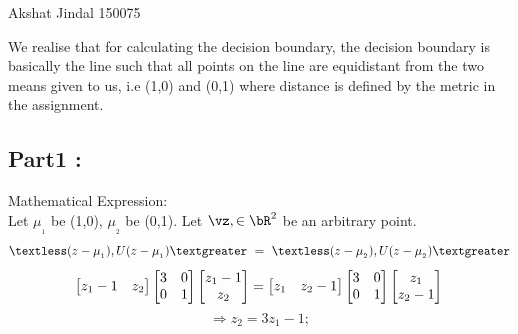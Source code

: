 \documentclass[a4paper,11pt]{article}
\begin{document}
								{Akshat Jindal}      						           		%
								{150075}																		%

\begin{mlsolution}


We realise that for calculating the decision boundary, the decision boundary is basically the line such that all points on the line are equidistant from the two means given to us, i.e (1,0) and (0,1) where distance is defined by the metric in the assignment.\\
\subsection*{Part1 :}
Mathematical Expression: \\
Let $\mu_{_{1}}$ be (1,0), $\mu_{_{2}}$ be (0,1). Let $\vz, \in \bR^2$ be an arbitrary point.  
\begin{equation}
    \textless(z-\mu_{_{1}} ), U(z-\mu_{_{1}})\textgreater  \ = \  \textless(z-\mu_{_{2}} ), U(z-\mu_{_{2}})\textgreater
\end{equation}
\begin{equation}
    \begin{bmatrix}
    z_{1}-1 & z_{2}
\end{bmatrix}
 \begin{bmatrix}
    3 & 0 \\
    0 & 1 
\end{bmatrix}
 \begin{bmatrix}
   z_{1}-1  \\
    z_{2}
\end{bmatrix}
=
    \begin{bmatrix}
    z_{1} & z_{2}-1
\end{bmatrix}
 \begin{bmatrix}
    3 & 0 \\
    0 & 1 
\end{bmatrix}
 \begin{bmatrix}
   z_{1}  \\
    z_{2}-1
\end{bmatrix} \\
\end{equation}
\begin{equation}
    \Rightarrow z_{2} = 3z_{1} - 1;
\end{equation} \\

\end{mlsolution}
\end{document}

